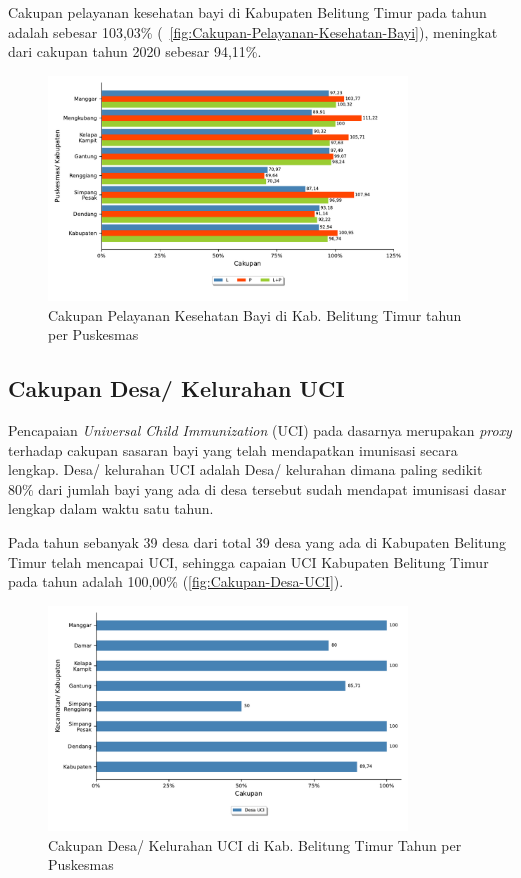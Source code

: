 Cakupan pelayanan kesehatan bayi di Kabupaten Belitung Timur pada
tahun \tP adalah sebesar 103,03\% (~\autoref{fig:Cakupan-Pelayanan-Kesehatan-Bayi}), meningkat dari cakupan tahun 2020
sebesar 94,11\%.

\begin{figure}[H]
    \centering
    \includegraphics[width=0.85\textwidth]{bab_05/bab_05_16_pelayananBayi}
    \caption{Cakupan Pelayanan Kesehatan Bayi di Kab. Belitung Timur tahun \tP per Puskesmas}
    \label{fig:Cakupan-Pelayanan-Kesehatan-Bayi}
\end{figure}

\subsection{Cakupan Desa/ Kelurahan UCI}
Pencapaian \emph{Universal Child Immunization} (UCI) pada dasarnya merupakan
\emph{proxy} terhadap cakupan sasaran bayi yang telah mendapatkan imunisasi
secara lengkap. Desa/ kelurahan UCI adalah Desa/ kelurahan dimana
paling sedikit 80\% dari jumlah bayi yang ada di desa tersebut sudah
mendapat imunisasi dasar lengkap dalam waktu satu tahun.

Pada tahun \tP sebanyak 39 desa dari total 39 desa yang ada di Kabupaten Belitung
Timur telah mencapai UCI, sehingga capaian UCI Kabupaten Belitung
Timur pada tahun \tP adalah 100,00\% (\autoref{fig:Cakupan-Desa-UCI}).

\begin{figure}[H]
    \centering
    \includegraphics[width=0.85\textwidth]{bab_05/bab_05_17_UCI}
    \caption{Cakupan Desa/ Kelurahan UCI di Kab. Belitung Timur Tahun \tP per Puskesmas}
    \label{fig:Cakupan-Desa-UCI}
\end{figure}

